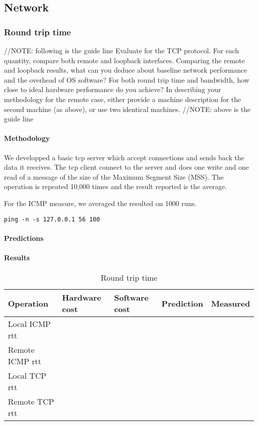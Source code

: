 \subsection{Network}

\subsubsection{Round trip time}

//NOTE: following is the guide line
Evaluate for the TCP protocol. For each quantity, compare both remote and loopback interfaces. Comparing the remote and loopback results, what can you deduce about baseline network performance and the overhead of OS software? For both round trip time and bandwidth, how close to ideal hardware performance do you achieve? In describing your methodology for the remote case, either provide a machine description for the second machine (as above), or use two identical machines.
//NOTE: above is the guide line

\paragraph{Methodology}
We developped a basic tcp server which accept connections and sends back the
data it receives.
The tcp client connect to the server and does one write and one read of a message of
the size of the Maximum Segment Size (MSS).
The operation is repeated 10,000 times and the result reported is the average.

For the ICMP measure, we averaged the resulted on 1000 runs.
\begin{verbatim}
ping -n -s 127.0.0.1 56 100 
\end{verbatim}

\paragraph{Predictions}
\paragraph{Results}
\begin{table}[h]
\begin{center}
\begin{tabular}{| l | l | l | l | l |}
\hline
Operation 			& Hardware cost 	& Software cost 		& Prediction 		& Measured \\
\hline
Local ICMP rtt		&				&					&				& 		\\
\hline
Remote ICMP rtt		&				&					&				& 		\\
\hline
Local TCP rtt		&				&					&				& 		\\
\hline
Remote TCP rtt		&				&					&				& 		\\
\hline


\end{tabular}
\end{center}
\caption{Round trip time\label{tab:rtt}}
\end{table}

